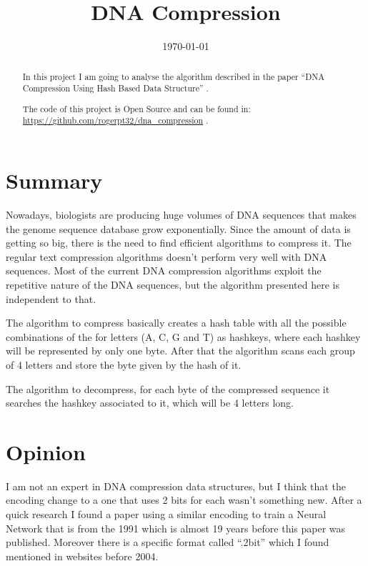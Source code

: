 \documentclass[conference,a4paper]{IEEEtran}
\begin{document}
\title{DNA Compression}

\author{
}

\date{\today}

\maketitle

\begin{abstract}
In this project I am going to analyse the algorithm described in the paper ``DNA Compression Using Hash Based Data Structure'' \cite{paper_dna_compression}.

The code of this project is Open Source and can be found in: \url{https://github.com/rogerpt32/dna_compression} \cite{code}.
\end{abstract}

\section{Summary}
Nowadays, biologists are producing huge volumes of DNA sequences that makes the genome sequence database grow exponentially. Since the amount of data is getting so big, there is the need to find efficient algorithms to compress it. The regular text compression algorithms doesn't perform very well with DNA sequences. Most of the current DNA compression algorithms exploit the repetitive nature of the DNA sequences, but the algorithm presented here is independent to that.

The algorithm to compress basically creates a hash table with all the possible combinations of the for letters (A, C, G and T) as hashkeys, where each hashkey will be represented by only one byte. After that the algorithm scans each group of 4 letters and store the byte given by the hash of it.

The algorithm to decompress, for each byte of the compressed sequence it searches the hashkey associated to it, which will be 4 letters long.

\section{Opinion}
I am not an expert in DNA compression data structures, but I think that the encoding change to a one that uses 2 bits for each wasn't something new. After a quick research I found a paper \cite{encoding} using a similar encoding to train a Neural Network that is from the 1991 which is almost 19 years before this paper was published. Moreover there is a specific format called ``.2bit'' which I found mentioned in websites before 2004. 
\end{document}
